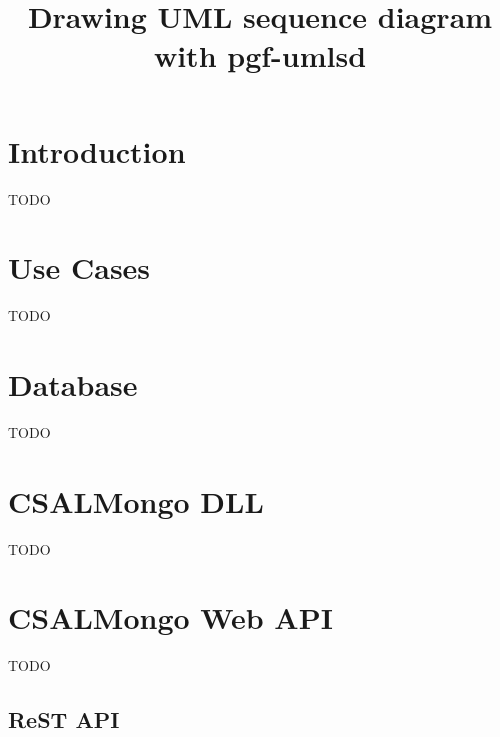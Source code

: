 \documentclass[letterpaper,10pt]{article}
\title{Drawing UML sequence diagram with pgf-umlsd}
\begin{document}
\setlength{\pdfpageheight}{\paperheight}
\setlength{\pdfpagewidth}{\paperwidth}

\setlength{\parindent}{0pt}
\setlength{\parskip}{6pt}

\maketitle
\tableofcontents
\pagebreak


\section{Introduction}

TODO


\section{Use Cases}

TODO


\section{Database}

TODO


\section{CSALMongo DLL}

TODO


\section{CSALMongo Web API}

TODO

\subsection{ReST API}
\end{document}
